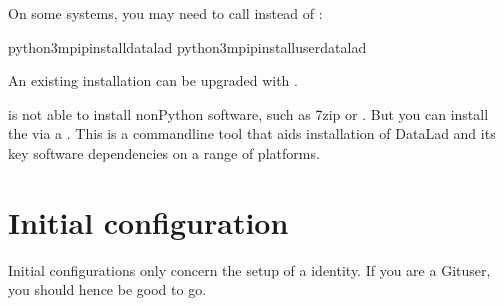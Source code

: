 \sphinxAtStartPar
On some systems, you may need to call  instead of :

\begin{sphinxVerbatim}[commandchars=\\\{\}]
python3\PYGZhy{}mpipinstalldatalad
python3\PYGZhy{}mpipinstall\PYGZhy{}\PYGZhy{}userdatalad
\end{sphinxVerbatim}

\sphinxAtStartPar
An existing installation can be upgraded with .

\sphinxAtStartPar
{} is not able to install non\sphinxhyphen{}Python software, such as 7\sphinxhyphen{}zip or
{\hyperref[\detokenize{glossary:term-git-annex}]{}}.  But you can install the  via a . This is a command\sphinxhyphen{}line tool that aids installation
of DataLad and its key software dependencies on a range of platforms.

\ignorespaces 

\section{Initial configuration}
\label{\detokenize{intro/installation:initial-configuration}}\label{\detokenize{intro/installation:installconfig}}\label{\detokenize{intro/installation:index-14}}
\sphinxAtStartPar
Initial configurations only concern the setup of a {\hyperref[\detokenize{glossary:term-Git}]{}} identity. If you
are a Git\sphinxhyphen{}user, you should hence be good to go.

\begin{figure}[tbp]
\centering

\noindent{}
\end{figure}

